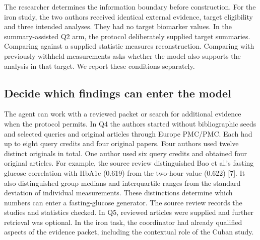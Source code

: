 \documentclass[11pt,letterpaper]{article}
\begin{document}
The researcher determines the information boundary before construction. For the iron study, the two authors received identical external evidence, target eligibility and three intended analyses. They had no target biomarker values. In the summary-assisted Q2 arm, the protocol deliberately supplied target summaries. Comparing against a supplied statistic measures reconstruction. Comparing with previously withheld measurements asks whether the model also supports the analysis in that target. We report these conditions separately.


\subsection{Decide which findings can enter the model}

The agent can work with a reviewed packet or search for additional evidence when the protocol permits. In Q4 the authors started without bibliographic seeds and selected queries and original articles through Europe PMC/\allowbreak{}PMC. Each had up to eight query credits and four original papers. Four authors used twelve distinct originals in total. One author used six query credits and obtained four original articles. For example, the source review distinguished Bao et al.'s fasting glucose correlation with HbA1c (0.619) from the two-hour value (0.622) [7]. It also distinguished group medians and interquartile ranges from the standard deviation of individual measurements. These distinctions determine which numbers can enter a fasting-glucose generator. The source review records the studies and statistics checked. In Q5, reviewed articles were supplied and further retrieval was optional. In the iron task, the coordinator had already qualified aspects of the evidence packet, including the contextual role of the Cuban study.


\FloatBarrier

\begingroup

\small

\renewcommand{\arraystretch}{1.22}
\end{document}
